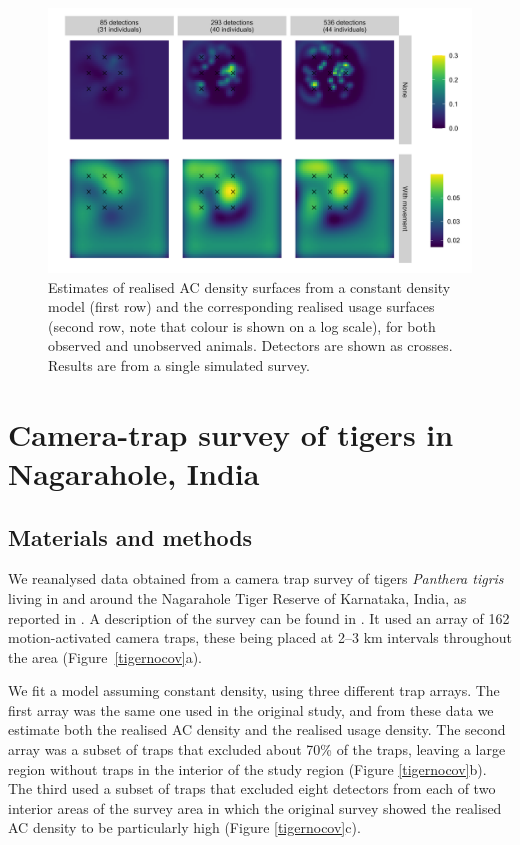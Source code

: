 \documentclass[10pt,a4paper]{article}
\begin{document}
\begin{figure}[htbp]
\centering
\includegraphics[width=1\textwidth]{mona_with_movement.png}
\caption{Estimates of realised AC density surfaces from a constant density model (first row) and the corresponding realised usage surfaces (second row, note that colour is shown on a log scale), for both observed and unobserved animals. Detectors are shown as crosses. Results are from a single simulated survey.}
\label{move}
\end{figure}

\section{Camera-trap survey of tigers in Nagarahole, India}

\subsection{Materials and methods}
We reanalysed data obtained from a camera trap survey of tigers {\it Panthera tigris} living in and around the Nagarahole Tiger Reserve of Karnataka, India, as reported in \cite{Dorazio+Karanth:17}. A description of the survey can be found in  \cite{Dorazio+Karanth:17}. It used an array of 162 motion-activated camera traps, these being placed at 2–3 km intervals throughout the area (Figure~\ref{tigernocov}a). 

We fit a model assuming constant density, using three different trap arrays. The first array was the same one used in the original study, and from these data we estimate both the realised AC density and the realised usage density. The second array was a subset of traps that excluded about 70\% of the traps, leaving a large region without traps in the interior of the study region (Figure \ref{tigernocov}b). The third used a subset of traps that excluded eight detectors from each of two interior areas of the survey area in which the original survey showed the realised AC density to be 
particularly high (Figure \ref{tigernocov}c). 
\end{document}
